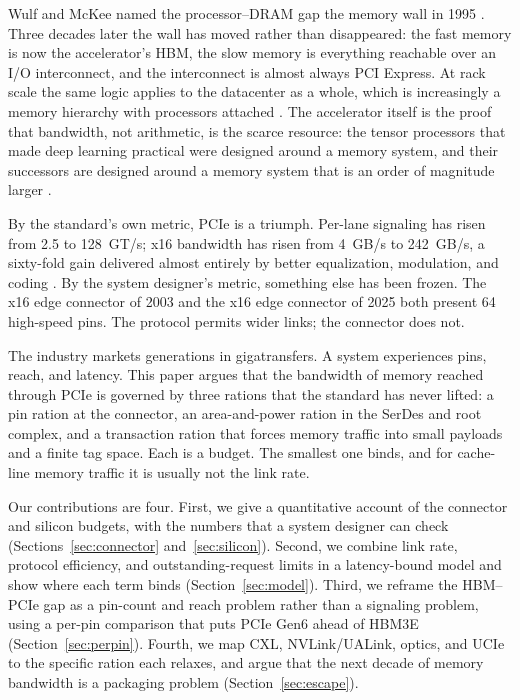 \documentclass[10pt,letterpaper]{article}
\begin{document}
Wulf and McKee named the processor--DRAM gap the memory wall in 1995 \cite{wulf}. Three decades later the wall has moved rather than disappeared: the fast memory is now the accelerator's HBM, the slow memory is everything reachable over an I/O interconnect, and the interconnect is almost always PCI Express. At rack scale the same logic applies to the datacenter as a whole, which is increasingly a memory hierarchy with processors attached \cite{barroso}. The accelerator itself is the proof that bandwidth, not arithmetic, is the scarce resource: the tensor processors that made deep learning practical were designed around a memory system, and their successors are designed around a memory system that is an order of magnitude larger \cite{jouppi}.

By the standard's own metric, PCIe is a triumph. Per-lane signaling has risen from 2.5 to 128~GT/s; x16 bandwidth has risen from 4~GB/s to 242~GB/s, a sixty-fold gain delivered almost entirely by better equalization, modulation, and coding \cite{pcie6,pcie7}. By the system designer's metric, something else has been frozen. The x16 edge connector of 2003 and the x16 edge connector of 2025 both present 64 high-speed pins. The protocol permits wider links; the connector does not.

The industry markets generations in gigatransfers. A system experiences pins, reach, and latency. This paper argues that the bandwidth of memory reached through PCIe is governed by three rations that the standard has never lifted: a pin ration at the connector, an area-and-power ration in the SerDes and root complex, and a transaction ration that forces memory traffic into small payloads and a finite tag space. Each is a budget. The smallest one binds, and for cache-line memory traffic it is usually not the link rate.

Our contributions are four. First, we give a quantitative account of the connector and silicon budgets, with the numbers that a system designer can check (Sections~\ref{sec:connector} and~\ref{sec:silicon}). Second, we combine link rate, protocol efficiency, and outstanding-request limits in a latency-bound model and show where each term binds (Section~\ref{sec:model}). Third, we reframe the HBM--PCIe gap as a pin-count and reach problem rather than a signaling problem, using a per-pin comparison that puts PCIe Gen6 ahead of HBM3E (Section~\ref{sec:perpin}). Fourth, we map CXL, NVLink/UALink, optics, and UCIe to the specific ration each relaxes, and argue that the next decade of memory bandwidth is a packaging problem (Section~\ref{sec:escape}).
\end{document}
